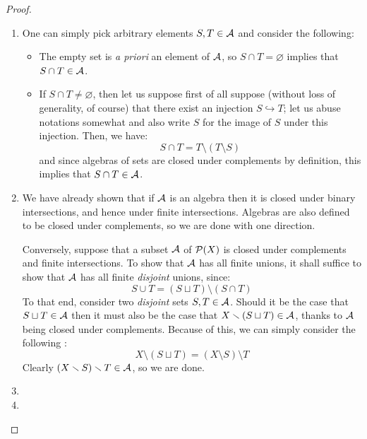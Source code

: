             \begin{proof}
                \noindent
                \begin{enumerate}
                    \item One can simply pick arbitrary elements $S, T \in \mathcal{A}$ and consider the following:
                        \begin{itemize}
                            \item The empty set is \textit{a priori} an element of $\mathcal{A}$, so $S \cap T = \varnothing$ implies that $S \cap T \in \mathcal{A}$.
                            \item If $S \cap T \not = \varnothing$, then let us suppose first of all suppose (without loss of generality, of course) that there exist an injection $S \hookrightarrow T$; let us abuse notations somewhat and also write $S$ for the image of $S$ under this injection. Then, we have:
                                $$S \cap T = T \setminus (T \setminus S)$$
                            and since algebras of sets are closed under complements by definition, this implies that $S \cap T \in \mathcal{A}$.
                        \end{itemize}
                    \item We have already shown that if $\mathcal{A}$ is an algebra then it is closed under binary intersections, and hence under finite intersections. Algebras are also defined to be closed under complements, so we are done with one direction.
                    
                    Conversely, suppose that a subset $\mathcal{A}$ of $\mathcal{P}(X)$ is closed under complements and finite intersections. To show that $\mathcal{A}$ has all finite unions, it shall suffice to show that $\mathcal{A}$ has all finite \textit{disjoint} unions, since:
                        $$S \cup T = (S \sqcup T) \setminus (S \cap T)$$
                    To that end, consider two \textit{disjoint} sets $S, T \in \mathcal{A}$. Should it be the case that $S \sqcup T \in \mathcal{A}$ then it must also be the case that $X \smallsetminus (S \sqcup T) \in \mathcal{A}$, thanks to $\mathcal{A}$ being closed under complements. Because of this, we can simply consider the following :
                        $$X \setminus (S \sqcup T) = (X \setminus S) \setminus T$$
                    Clearly $(X \smallsetminus S) \smallsetminus T \in \mathcal{A}$, so we are done.
                    \item 
                    \item 
                \end{enumerate}
            \end{proof}
